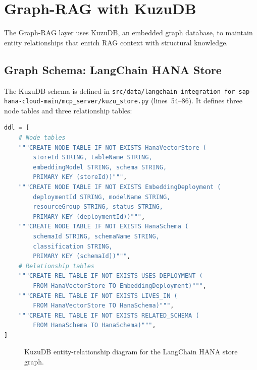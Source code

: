 \documentclass[11pt]{article}
\newcommand{\filepath}[1]{\texttt{#1}}
\begin{document}
\section{Graph-RAG with KuzuDB}
\label{sec:graph-rag}

The Graph-RAG layer uses KuzuDB, an embedded graph database, to maintain
entity relationships that enrich RAG context with structural knowledge.

\subsection{Graph Schema: LangChain HANA Store}

The KuzuDB schema is defined in
\filepath{src/data/langchain-integration-for-sap-hana-cloud-main/mcp\_server/kuzu\_store.py}
(lines~54--86).  It defines three node tables and three relationship tables:

\begin{lstlisting}[language=Python,caption={KuzuDB DDL (kuzu\_store.py lines 54--86)},label=lst:kuzu-schema]
ddl = [
    # Node tables
    """CREATE NODE TABLE IF NOT EXISTS HanaVectorStore (
        storeId STRING, tableName STRING,
        embeddingModel STRING, schema STRING,
        PRIMARY KEY (storeId))""",
    """CREATE NODE TABLE IF NOT EXISTS EmbeddingDeployment (
        deploymentId STRING, modelName STRING,
        resourceGroup STRING, status STRING,
        PRIMARY KEY (deploymentId))""",
    """CREATE NODE TABLE IF NOT EXISTS HanaSchema (
        schemaId STRING, schemaName STRING,
        classification STRING,
        PRIMARY KEY (schemaId))""",
    # Relationship tables
    """CREATE REL TABLE IF NOT EXISTS USES_DEPLOYMENT (
        FROM HanaVectorStore TO EmbeddingDeployment)""",
    """CREATE REL TABLE IF NOT EXISTS LIVES_IN (
        FROM HanaVectorStore TO HanaSchema)""",
    """CREATE REL TABLE IF NOT EXISTS RELATED_SCHEMA (
        FROM HanaSchema TO HanaSchema)""",
]
\end{lstlisting}

\begin{figure}[h]
\centering
{}
\caption{KuzuDB entity-relationship diagram for the LangChain HANA store graph.}
\label{fig:kuzu-er}
\end{figure}
\end{document}
